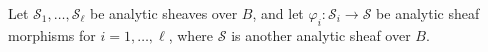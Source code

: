 Let $\mathcal{S}_1, \ldots, \mathcal{S}_\ell$ be analytic sheaves over $B$, and let $\varphi_i: \mathcal{S}_i \rightarrow \mathcal{S}$ be analytic sheaf morphisms for $i = 1, \ldots, \ell$, where $\mathcal{S}$ is another analytic sheaf over $B$.
